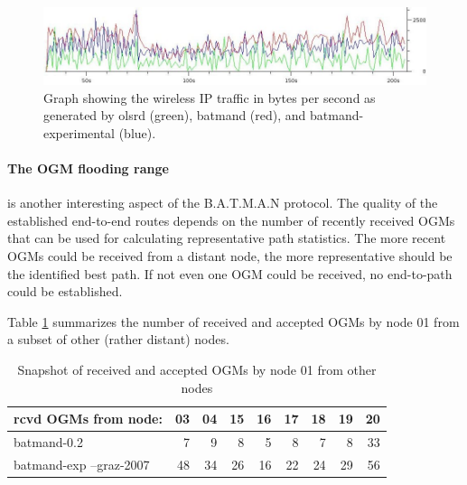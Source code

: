\documentclass[11pt]{article}
\begin{document}
\begin{figure}[htb]
  \begin{center}
    \includegraphics[width=16cm]{io-graph-bat-bmx-olsr-select.jpg}
    \caption{Graph showing the wireless IP traffic in bytes per second as generated by olsrd (green), batmand (red), and batmand-experimental (blue).}
    \label{fig:protocol-traffic}
  \end{center}
\end{figure}


\paragraph{The OGM flooding range} is another interesting aspect of the B.A.T.M.A.N protocol.
%
%
The quality of the established end-to-end routes depends on the number of recently received OGMs that can be used for calculating representative path statistics. The more recent OGMs could be received from a distant node, the more representative should be the identified best path.
%
If not even one OGM could be received, no end-to-path could be established.

Table \ref{tab:ogm-range} summarizes the number of received and accepted OGMs by node 01 from a subset of other (rather distant) nodes.

\begin{table}[htb]
\begin{center}
\begin{tabular}{|l|rrrrrrrr|}

\hline
rcvd OGMs from node:    & 03 & 04 & 15 & 16 & 17 & 18 & 19 & 20 \\
\hline
batmand-0.2		& 7  & 9  & 8  & 5  & 8  & 7  & 8  & 33 \\
batmand-exp --graz-2007	& 48 & 34 & 26 & 16 & 22 & 24 & 29 & 56 \\
\hline
\end{tabular}
\caption{Snapshot of received and accepted OGMs by node 01 from other nodes}
\label{tab:ogm-range}
\end{center}
\end{table}%
\end{document}
